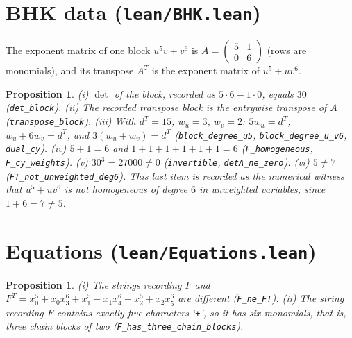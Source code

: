 \documentclass[11pt]{amsart}
\newtheorem{proposition}[theorem]{Proposition}
\theoremstyle{definition}
\theoremstyle{remark}
\begin{document}
\section{BHK data (\texttt{lean/BHK.lean})}
The exponent matrix of one block $u^5v+v^6$ is $A=\begin{pmatrix}5&1\\0&6\end{pmatrix}$ (rows are monomials), and its transpose $A^T$ is the exponent matrix of $u^5+uv^6$.
\begin{proposition}
(i) $\det$ of the block, recorded as $5\cdot6-1\cdot0$, equals $30$ (\texttt{det\_block}). (ii) The recorded transpose block is the entrywise transpose of $A$ (\texttt{transpose\_block}). (iii) With $d^T=15$, $w_u=3$, $w_v=2$: $5w_u=d^T$, $w_u+6w_v=d^T$, and $3(w_u+w_v)=d^T$ (\texttt{block\_degree\_u5}, \texttt{block\_degree\_u\_v6}, \texttt{dual\_cy}). (iv) $5+1=6$ and $1+1+1+1+1+1=6$ (\texttt{F\_homogeneous}, \texttt{F\_cy\_weights}). (v) $30^3=27000\ne0$ (\texttt{invertible}, \texttt{detA\_ne\_zero}). (vi) $5\ne7$ (\texttt{FT\_not\_unweighted\_deg6}). This last item is recorded as the numerical witness that $u^5+uv^6$ is not homogeneous of degree $6$ in unweighted variables, since $1+6=7\neq5$.
\end{proposition}

\section{Equations (\texttt{lean/Equations.lean})}
\begin{proposition}
(i) The strings recording $F$ and $F^T=x_0^5+x_0x_3^6+x_1^5+x_1x_4^6+x_2^5+x_2x_5^6$ are different (\texttt{F\_ne\_FT}). (ii) The string recording $F$ contains exactly five characters `\texttt{+}', so it has six monomials, that is, three chain blocks of two (\texttt{F\_has\_three\_chain\_blocks}).
\end{proposition}
\end{document}
